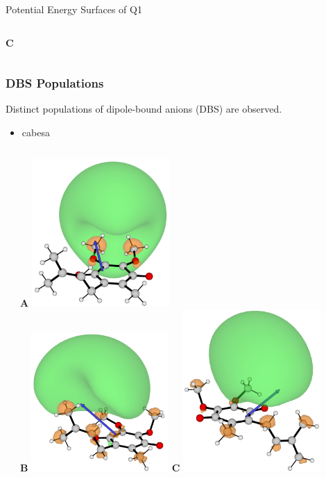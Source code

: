 \documentclass[9pt,t,xcolor=table]{beamer}
\begin{document}
\begin{frame}{\huge Potential Energy Surfaces of Q1}
\begin{columns}[t]
\begin{column}{0.45\textwidth}
\begin{columns}[b]
\begin{column}{0.3\textwidth}
					\textbf{C}
				\end{column}
			\end{columns}
		\end{column}
	\end{columns}
\end{frame}

\begin{frame}
	\frametitle{\huge DBS Populations}\large
	Distinct populations of dipole-bound anions (DBS) are observed.\\
	\begin{itemize}
		\item cabesa
	\end{itemize}
	\vspace{5pt}
	\begin{columns}[c]
		\begin{column}{0.62\textwidth}
			\centering
			\small	
			
		\end{column}
		\hspace{30pt}
		\begin{column}{0.3\textwidth}
			\centering
	 		\textbf{A} \includegraphics[width=0.41\textwidth]{Figs/Q1_199.png} \hfill\\
			\textbf{B} \includegraphics[width=0.41\textwidth]{Figs/Q1_249.png} \hfill
			\textbf{C} \includegraphics[width=0.41\textwidth]{Figs/Q1_112.png} \hfill 

\end{column}
\end{columns}
\end{frame}
\end{document}
